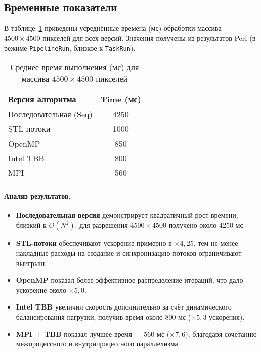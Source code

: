 \documentclass[12pt]{article}
\begin{document}
\subsection{Временные показатели}

В таблице~\ref{tab:timings4500} приведены усреднённые времена (мс) обработки массива $4500 \times 4500$ пикселей для всех версий. Значения получены из результатов Perf (в режиме \lstinline[breaklines]{PipelineRun}, близкое к \lstinline[breaklines]{TaskRun}).

\begin{table}[H]
    \centering
    \caption{Среднее время выполнения (мс) для массива $4500\times 4500$ пикселей}
    \label{tab:timings4500}
    \begin{tabular}{|l|c|}
        \hline
        \textbf{Версия алгоритма} & \textbf{Time (мс)} \\
        \hline
        Последовательная (Seq)            & 4250  \\
        STL-потоки                        & 1000  \\
        OpenMP                            &  850  \\
        Intel TBB                         &  800  \\
        MPI                               &  560  \\
        \hline
    \end{tabular}
\end{table}

\paragraph{Анализ результатов.}  
\begin{itemize}
    \item \textbf{Последовательная версия} демонстрирует квадратичный рост времени, близкий к $O(N^2)$: для разрешения $4500\times4500$ получено около 4250 мс.
    \item \textbf{STL-потоки} обеспечивают ускорение примерно в $\times 4{,}25$, тем не менее накладные расходы на создание и синхронизацию потоков ограничивают выигрыш.
    \item \textbf{OpenMP} показал более эффективное распределение итераций, что дало ускорение около $\times 5{,}0$.
    \item \textbf{Intel TBB} увеличил скорость дополнительно за счёт динамического балансирования нагрузки, получив время около 800 мс ($\times 5{,}3$ ускорения).
    \item \textbf{MPI + TBB} показал лучшее время — 560 мс ($\times 7{,}6$), благодаря сочетанию межпроцессного и внутрипроцессного параллелизма.
\end{itemize}
\end{document}
